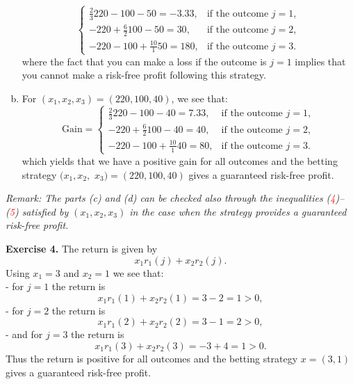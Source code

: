 \documentclass[11pt,a4paper]{article}
\begin{document}
\begin{enumerate}[(a)]
$$\begin{cases}
            \frac{2}{3}220-100-50=-3.33, & \text{if the outcome $j = 1$},\\
            -220+\frac{6}{2}100-50=30, & \text{if the outcome $j = 2$},\\
            -220-100+\frac{10}{1}50 = 180, & \text{if the outcome $j = 3$}.
        \end{cases}
        $$
        where the fact that you can make a loss if the outcome is $j = 1$ implies that you cannot make a risk-free profit following this strategy.
        \item For $(x_1, x_2, x_3) = (220, 100, 40)$, we see that:
        $$
        \text{Gain}
        =
        \begin{cases}
            \frac{2}{3}220-100-40 = 7.33, & \text{if the outcome $j =1$},\\
            -220+\frac{6}{2}100-40 = 40, & \text{if the outcome $j =2$},\\
            -220-100+\frac{10}{1}40=80, & \text{if the outcome $j =3$}.
        \end{cases}
        $$
        which yields that we have a positive gain for all outcomes and the betting strategy $(x_1, x_2,$ $x_3) = (220, 100, 40)$ gives a guaranteed risk-free profit.
    \end{enumerate}
    \textsl{Remark: The parts (c) and (d) can be checked also through the inequalities (\textcolor{red}{4})–(\textcolor{red}{5}) satisfied by $(x_1, x_2, x_3)$ in the case when the strategy provides a guaranteed risk-free profit.}\par 
    \textbf{Exercise 4.} The return is given by
    $$
    x_1r_1(j)+x_2r_2(j).
    $$
    Using $x_1 = 3$ and $x_2 = 1$ we see that:\\
    - for $j=1$ the return is
    $$
    x_1r_1(1) + x_2r_2(1) = 3 − 2 = 1 > 0, 
    $$
    - for $j = 2$ the return is
    $$
    x_1r_1(2) + x_2r_2(2) = 3 − 1 = 2 > 0,
    $$
    - and for $j = 3$ the return is
    $$
    x_1r_1(3) + x_2r_2(3) = −3 + 4 = 1 > 0.
    $$
    Thus the return is positive for all outcomes and the betting strategy $x = (3, 1)$ gives a guaranteed risk-free profit.
\end{document}
